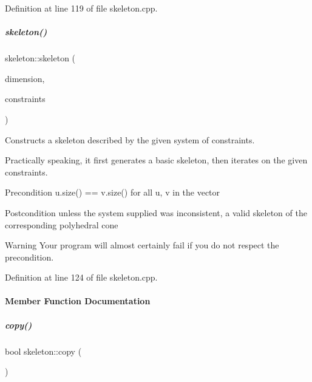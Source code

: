 Definition at line 119 of file skeleton.\+cpp.

\mbox{\label{group___c_l_s_solvers_a5d0ebc69ae4ff20afd3096e36b31ab1f}} 
\subparagraph{\texorpdfstring{skeleton()}{skeleton()}\hspace{0.1cm}{\footnotesize\ttfamily [2/2]}}
{\footnotesize\ttfamily skeleton\+::skeleton (\begin{DoxyParamCaption}\item[{N\+V\+A\+R\+\_\+\+T\+Y\+PE}]{dimension,  }\item[{vector$<$ \hyperlink{group___c_l_s_solvers_classconstraint}{constraint} $>$ \&}]{constraints }\end{DoxyParamCaption})}



Constructs a skeleton described by the given system of constraints. 

Practically speaking, it first generates a basic skeleton, then iterates on the given constraints. \begin{DoxyPrecond}{Precondition}
{\ttfamily u.\+size() == v.\+size()} for all {\ttfamily u}, {\ttfamily v} in the vector 
\end{DoxyPrecond}
\begin{DoxyPostcond}{Postcondition}
unless the system supplied was inconsistent, a valid skeleton of the corresponding polyhedral cone 
\end{DoxyPostcond}
\begin{DoxyWarning}{Warning}
Your program will almost certainly fail if you do not respect the precondition. 
\end{DoxyWarning}


Definition at line 124 of file skeleton.\+cpp.



\paragraph{Member Function Documentation}
\mbox{\label{group___c_l_s_solvers_a42d30b92f27936eab11d0fa4f0cc10b4}} 
\subparagraph{\texorpdfstring{copy()}{copy()}}
{\footnotesize\ttfamily bool skeleton\+::copy (\begin{DoxyParamCaption}\item[{const \hyperlink{group___c_l_s_solvers_class_l_p___solver}{L\+P\+\_\+\+Solver} $\ast$}]{ }\end{DoxyParamCaption})\hspace{0.3cm}{\ttfamily [virtual]}}



